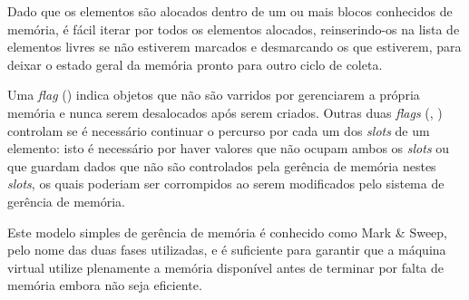 Dado que os elementos são alocados dentro de um ou mais blocos conhecidos de
memória, é fácil iterar por todos os elementos alocados, reinserindo-os na
lista de elementos livres se não estiverem marcados e desmarcando os que
estiverem, para deixar o estado geral da memória pronto para outro ciclo de
coleta.

Uma \textit{flag} () indica objetos
que não são varridos por gerenciarem a própria memória e nunca serem
desalocados após serem criados. Outras duas \textit{flags}
(, ) controlam se é
necessário continuar o percurso por cada um dos \textit{slots} de um elemento:
isto é necessário por haver valores que não ocupam ambos os
\textit{slots} ou que guardam dados que não são controlados
pela gerência de memória nestes \textit{slots}, os quais poderiam ser
corrompidos ao serem modificados pelo sistema de gerência de memória.

Este modelo simples de gerência de memória é conhecido como Mark \& Sweep, pelo
nome das duas fases utilizadas\cite{jones:gc}, e é suficiente para garantir que a máquina
virtual utilize plenamente a memória disponível antes de terminar por falta de
memória embora não seja eficiente.

